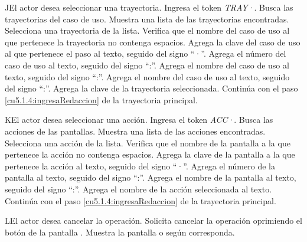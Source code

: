  \begin{UCtrayectoriaA}{J}{El actor desea seleccionar una trayectoria.}
 	\UCpaso[\UCactor] Ingresa el token {\it TRAY·}.
	\UCpaso[\UCsist] Busca las trayectorias del caso de uso.
  	\UCpaso[\UCsist] Muestra una lista de las trayectorias encontradas.
 	\UCpaso[\UCactor] Selecciona una trayectoria de la lista.
  	\UCpaso[\UCsist] Verifica que el nombre del caso de uso al que pertenece la trayectoria no contenga espacios. 
  	\UCpaso[\UCsist] Agrega la clave del caso de uso al que pertenece el paso al texto, seguido del signo ``·''.
  	\UCpaso[\UCsist] Agrega el número del caso de uso al texto, seguido del signo ``:''.
  	\UCpaso[\UCsist] Agrega el nombre del caso de uso al texto, seguido del signo ``:''.
  	\UCpaso[\UCsist] Agrega el nombre del caso de uso al texto, seguido del signo ``:''.
  	\UCpaso[\UCsist] Agrega la clave de la trayectoria seleccionada.
    \UCpaso[] Continúa con el paso \ref{cu5.1.4:ingresaRedaccion} de la trayectoria principal.
 \end{UCtrayectoriaA}
 \begin{UCtrayectoriaA}{K}{El actor desea seleccionar una acción.}
 	\UCpaso[\UCactor] Ingresa el token {\it ACC·}.
	\UCpaso[\UCsist] Busca las acciones de las pantallas.
  	\UCpaso[\UCsist] Muestra una lista de las acciones encontradas.
 	\UCpaso[\UCactor] Selecciona una acción de la lista.
  	\UCpaso[\UCsist] Verifica que el nombre de la pantalla a la que pertenece la acción no contenga espacios. 
  	\UCpaso[\UCsist] Agrega la clave de la pantalla a la que pertenece la acción al texto, seguido del signo ``·''.
  	\UCpaso[\UCsist] Agrega el número de la pantalla al texto, seguido del signo ``:''.
  	\UCpaso[\UCsist] Agrega el nombre de la pantalla al texto, seguido del signo ``:''.
  	\UCpaso[\UCsist] Agrega el nombre de la acción seleccionada al texto.
    \UCpaso[] Continúa con el paso \ref{cu5.1.4:ingresaRedaccion} de la trayectoria principal.
 \end{UCtrayectoriaA}

 \begin{UCtrayectoriaA}{L}{El actor desea cancelar la operación.}
    \UCpaso[\UCactor] Solicita cancelar la operación oprimiendo el botón  de la pantalla .
    \UCpaso[\UCsist] Muestra la pantalla  o  según corresponda.
 \end{UCtrayectoriaA}
 
